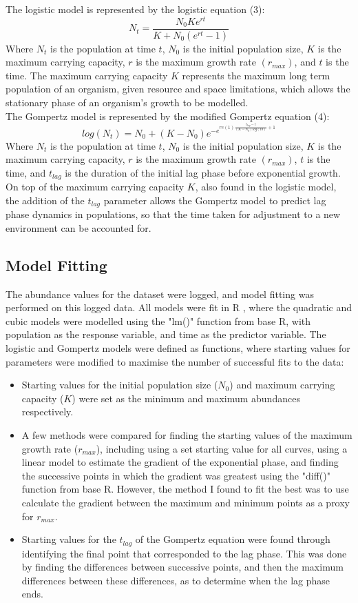 \documentclass[11pt, letterpaper]{article}
\begin{document}
\noindent The logistic model is represented by the logistic equation (3):
\[ 
    N_t = \frac{N_0Ke^{rt}}{K + N_0(e^{rt} -1)} \tag{3}
\]
Where \(N_t\) is the population at time \(t\), \(N_0\) is the initial population size, \(K\) is the maximum carrying capacity, \(r\) is the maximum growth rate \((r_{max})\), and \(t\) is the time. The maximum carrying capacity $K$ represents the maximum long term population of an organism, given resource and space limitations, which allows the stationary phase of an organism's growth to be modelled.\\

\noindent The Gompertz model is represented by the modified Gompertz equation \citep{zwietering_modeling_1990} (4):
\[ 
    log(N_t) = N_0 + (K - N_0)e^{-e^{re(1)\frac{t_{lag}-t}{(K - N_0)log(10)}+1}} \tag{4}
\]
Where \(N_t\) is the population at time \(t\), \(N_0\) is the initial population size, \(K\) is the maximum carrying capacity, \(r\) is the maximum growth rate \((r_{max})\), \(t\) is the time, and \(t_{lag}\) is the duration of the initial lag phase before exponential growth. On top of the maximum carrying capacity $K$, also found in the logistic model, the addition of the $t_{lag}$ parameter allows the Gompertz model to predict lag phase dynamics in populations, so that the time taken for adjustment to a new environment can be accounted for.

\subsection{Model Fitting}
The abundance values for the dataset were logged, and model fitting was performed on this logged data. All models were fit in R \citep{R}, where the quadratic and cubic models were modelled using the "lm()" function from base R, with population as the response variable, and time as the predictor variable. The logistic and Gompertz models were defined as functions, where starting values for parameters were modified to maximise the number of successful fits to the data: 
\begin{itemize}
    \item Starting values for the initial population size ($N_0$) and maximum carrying capacity ($K$) were set as the minimum and maximum abundances respectively.
    \item A few methods were compared for finding the starting values of the maximum growth rate ($r_{max}$), including using a set starting value for all curves, using a linear model to estimate the gradient of the exponential phase, and finding the successive points in which the gradient was greatest using the "diff()" function from base R. However, the method I found to fit the best was to use calculate the gradient between the maximum and minimum points as a proxy for $r_{max}$.
    \item Starting values for the $t_{lag}$ of the Gompertz equation were found through identifying the final point that corresponded to the lag phase. This was done by finding the differences between successive points, and then the maximum differences between these differences, as to determine when the lag phase ends.
\end{itemize}
\end{document}

